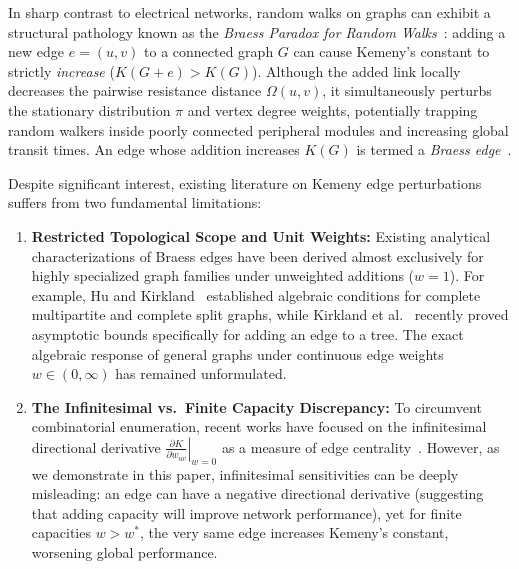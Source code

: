 \documentclass[11pt,a4paper]{article}
\theoremstyle{plain}
\theoremstyle{definition}
\begin{document}
In sharp contrast to electrical networks, random walks on graphs can exhibit a structural pathology known as the \textit{Braess Paradox for Random Walks}~\cite{hu2019complete,kirkland2023edge,bini2023edge}: adding a new edge $e = (u, v)$ to a connected graph $G$ can cause Kemeny's constant to strictly \textit{increase} ($K(G + e) > K(G)$). Although the added link locally decreases the pairwise resistance distance $\Omega(u, v)$, it simultaneously perturbs the stationary distribution $\pi$ and vertex degree weights, potentially trapping random walkers inside poorly connected peripheral modules and increasing global transit times. An edge whose addition increases $K(G)$ is termed a \textit{Braess edge}~\cite{hu2019complete}.

Despite significant interest, existing literature on Kemeny edge perturbations suffers from two fundamental limitations:
\begin{enumerate}
    \item \textbf{Restricted Topological Scope and Unit Weights:} Existing analytical characterizations of Braess edges have been derived almost exclusively for highly specialized graph families under unweighted additions ($w = 1$). For example, Hu and Kirkland~\cite{hu2019complete} established algebraic conditions for complete multipartite and complete split graphs, while Kirkland et al.~\cite{kirkland2023edge} recently proved asymptotic bounds specifically for adding an edge to a tree. The exact algebraic response of general graphs under continuous edge weights $w \in (0, \infty)$ has remained unformulated.
    \item \textbf{The Infinitesimal vs.\ Finite Capacity Discrepancy:} To circumvent combinatorial enumeration, recent works have focused on the infinitesimal directional derivative $\left.\frac{\partial K}{\partial w_{uv}}\right|_{w=0}$ as a measure of edge centrality~\cite{bini2023edge}. However, as we demonstrate in this paper, infinitesimal sensitivities can be deeply misleading: an edge can have a negative directional derivative (suggesting that adding capacity will improve network performance), yet for finite capacities $w > w^*$, the very same edge increases Kemeny's constant, worsening global performance.
\end{enumerate}
\end{document}
